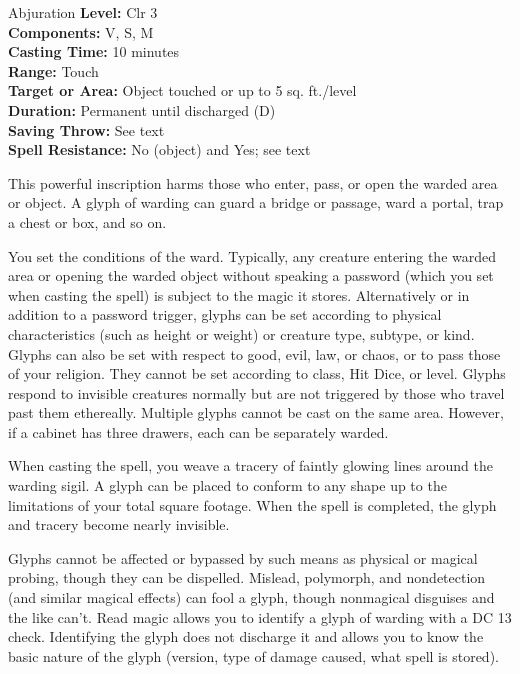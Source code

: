{Abjuration}
{
	\textbf{Level:}
	Clr 3\\
	\textbf{Components:}
	V, S, M\\
	\textbf{Casting Time:}
	10 minutes\\
	\textbf{Range:}
	Touch\\
	\textbf{Target or Area:}
	Object touched or up to 5 sq. ft./level\\
	\textbf{Duration:}
	Permanent until discharged (D)\\
	\textbf{Saving Throw:}
	See text\\
	\textbf{Spell Resistance:}
	No (object) and Yes; see text\\
}
{
	This powerful inscription harms those who enter, pass, or open the warded area or object. A glyph of warding can guard a bridge or passage, ward a portal, trap a chest or box, and so on.

	You set the conditions of the ward. Typically, any creature entering the warded area or opening the warded object without speaking a password (which you set when casting the spell) is subject to the magic it stores. Alternatively or in addition to a password trigger, glyphs can be set according to physical characteristics (such as height or weight) or creature type, subtype, or kind. Glyphs can also be set with respect to good, evil, law, or chaos, or to pass those of your religion. They cannot be set according to class, Hit Dice, or level. Glyphs respond to invisible creatures normally but are not triggered by those who travel past them ethereally. Multiple glyphs cannot be cast on the same area. However, if a cabinet has three drawers, each can be separately warded.

	When casting the spell, you weave a tracery of faintly glowing lines around the warding sigil. A glyph can be placed to conform to any shape up to the limitations of your total square footage. When the spell is completed, the glyph and tracery become nearly invisible.

	Glyphs cannot be affected or bypassed by such means as physical or magical probing, though they can be dispelled. Mislead, polymorph, and nondetection (and similar magical effects) can fool a glyph, though nonmagical disguises and the like can't. Read magic allows you to identify a glyph of warding with a DC 13  check. Identifying the glyph does not discharge it and allows you to know the basic nature of the glyph (version, type of damage caused, what spell is stored).

}
